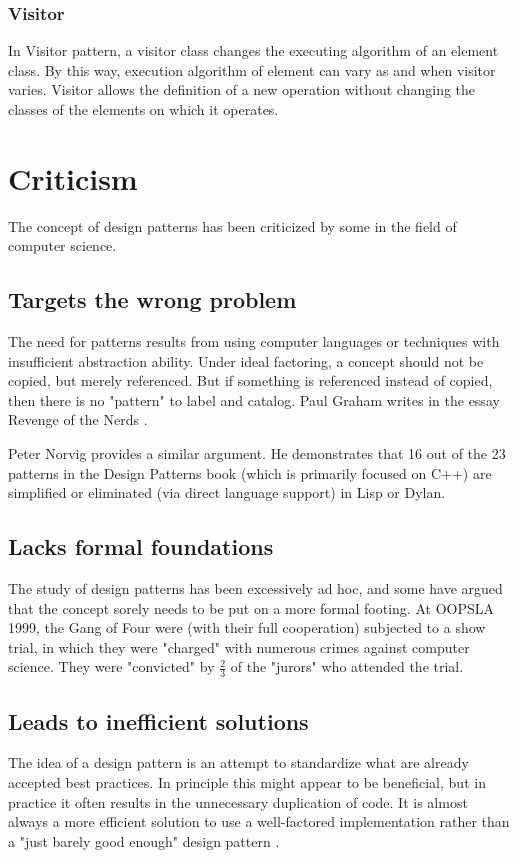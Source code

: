 \documentclass[sigplan,12pt,nonacm=true,review=false]{acmart}
\begin{document}
\subsubsection{Visitor}
In Visitor pattern, a visitor class changes the executing algorithm of an element class. By this way, execution algorithm of element can vary as and when visitor varies. Visitor allows the definition of a new operation without changing the classes of the elements on which it operates.


\section{Criticism}
The concept of design patterns has been criticized by some in the field of computer science.

\subsection{Targets the wrong problem}
The need for patterns results from using computer languages or techniques with insufficient abstraction ability. Under ideal factoring, a concept should not be copied, but merely referenced. But if something is referenced instead of copied, then there is no "pattern" to label and catalog. Paul Graham writes in the essay Revenge of the Nerds \cite{noauthor_design_nodate}.

Peter Norvig provides a similar argument. He demonstrates that 16 out of the 23 patterns in the Design Patterns book (which is primarily focused on C++) are simplified or eliminated (via direct language support) in Lisp or Dylan.

\subsection{Lacks formal foundations}
The study of design patterns has been excessively ad hoc, and some have argued that the concept sorely needs to be put on a more formal footing. At OOPSLA 1999, the Gang of Four were (with their full cooperation) subjected to a show trial, in which they were "charged" with numerous crimes against computer science. They were "convicted" by $\frac{2}{3}$ of the "jurors" who attended the trial.

\subsection{Leads to inefficient solutions}
The idea of a design pattern is an attempt to standardize what are already accepted best practices. In principle this might appear to be beneficial, but in practice it often results in the unnecessary duplication of code. It is almost always a more efficient solution to use a well-factored implementation rather than a "just barely good enough" design pattern \cite{noauthor_design_nodate}.
\end{document}
